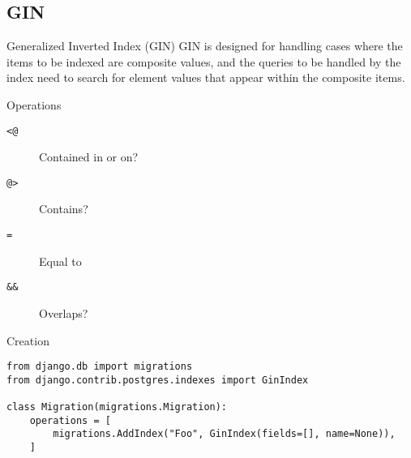 \subsection{GIN}
\begin{frame}[fragile]{Generalized Inverted Index (GIN)}
    GIN is designed for handling cases where the items to be indexed are composite values, and the queries to be handled by the index need to search for element values that appear within the composite items.

    \begin{block}{Operations}
        \begin{description}
            \item[\texttt{<}\texttt{@}] Contained in or on?
            \item[\texttt{@}\texttt{>}] Contains?
            \item[\texttt{=}] Equal to
            \item[\texttt{\&}\texttt{\&}] Overlaps?
        \end{description}
    \end{block}

    \begin{block}{Creation}
        \begin{verbatim}
from django.db import migrations
from django.contrib.postgres.indexes import GinIndex

class Migration(migrations.Migration):
    operations = [
        migrations.AddIndex("Foo", GinIndex(fields=[], name=None)),
    ]
        \end{verbatim}
    \end{block}
\end{frame}

